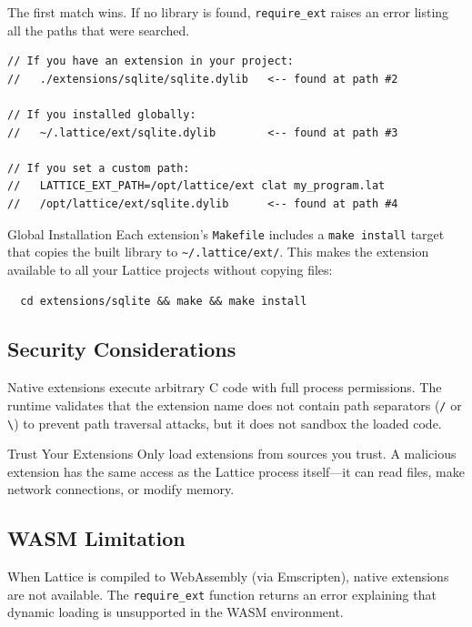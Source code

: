 The first match wins. If no library is found, \lstinline|require_ext| raises an error listing all the paths that were searched.

\begin{lstlisting}[language=Lattice, caption={Extension search path behavior}]
// If you have an extension in your project:
//   ./extensions/sqlite/sqlite.dylib   <-- found at path #2

// If you installed globally:
//   ~/.lattice/ext/sqlite.dylib        <-- found at path #3

// If you set a custom path:
//   LATTICE_EXT_PATH=/opt/lattice/ext clat my_program.lat
//   /opt/lattice/ext/sqlite.dylib      <-- found at path #4
\end{lstlisting}

\begin{tipbox}{Global Installation}
Each extension's \lstinline|Makefile| includes a \lstinline|make install| target that copies the built library to \lstinline|~/.lattice/ext/|. This makes the extension available to all your Lattice projects without copying files:
\begin{verbatim}
  cd extensions/sqlite && make && make install
\end{verbatim}
\end{tipbox}

\subsection{Security Considerations}

Native extensions execute arbitrary C code with full process permissions.
The runtime validates that the extension name does not contain path separators (\lstinline|/| or \lstinline|\|) to prevent path traversal attacks, but it does not sandbox the loaded code.

\begin{warnbox}{Trust Your Extensions}
Only load extensions from sources you trust.
A malicious extension has the same access as the Lattice process itself---it can read files, make network connections, or modify memory.
\end{warnbox}

\subsection{WASM Limitation}

When Lattice is compiled to WebAssembly (via Emscripten), native extensions are not available.
The \lstinline|require_ext| function returns an error explaining that dynamic loading is unsupported in the WASM environment.


